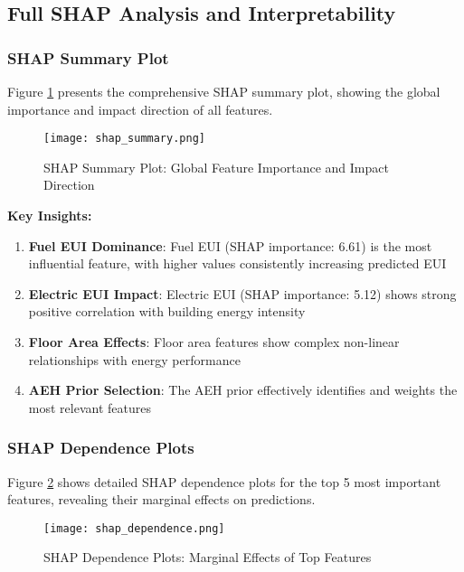 \subsection{Full SHAP Analysis and Interpretability}

\subsubsection{SHAP Summary Plot}

Figure \ref{fig:shap_summary} presents the comprehensive SHAP summary plot, showing the global importance and impact direction of all features.

\begin{figure}[h!]
\centering
\texttt{[image: shap\_summary.png]}
\caption{SHAP Summary Plot: Global Feature Importance and Impact Direction}
\label{fig:shap_summary}
\end{figure}

\textbf{Key Insights:}
\begin{enumerate}
    \item \textbf{Fuel EUI Dominance}: Fuel EUI (SHAP importance: 6.61) is the most influential feature, with higher values consistently increasing predicted EUI
    \item \textbf{Electric EUI Impact}: Electric EUI (SHAP importance: 5.12) shows strong positive correlation with building energy intensity
    \item \textbf{Floor Area Effects}: Floor area features show complex non-linear relationships with energy performance
    \item \textbf{AEH Prior Selection}: The AEH prior effectively identifies and weights the most relevant features
\end{enumerate}

\subsubsection{SHAP Dependence Plots}

Figure \ref{fig:shap_dependence} shows detailed SHAP dependence plots for the top 5 most important features, revealing their marginal effects on predictions.

\begin{figure}[h!]
\centering
\texttt{[image: shap\_dependence.png]}
\caption{SHAP Dependence Plots: Marginal Effects of Top Features}
\label{fig:shap_dependence}
\end{figure}

